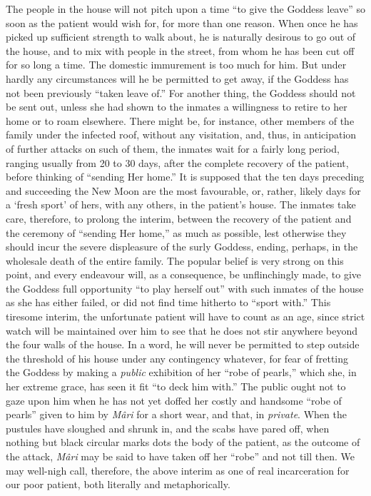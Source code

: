 \documentclass[a4paper, 12pt, oneside, english]{article}
\begin{document}
The people in the house will not pitch upon a time ``to give the Goddess leave'' so soon as the patient would wish for, for more than one reason. When once he has picked up sufficient strength to walk about, he is naturally desirous to go out of the house, and to mix with people in the street, from whom he has been cut off for so long a time. The domestic immurement is too much for him. But under hardly any circumstances will he be permitted to get away, if the Goddess has not been previously ``taken leave of.'' For another thing, the Goddess should not be sent out, unless she had shown to the inmates a willingness to retire to her home or to roam elsewhere. There might be, for instance, other members of the family under the infected roof, without any visitation, and, thus, in anticipation of further attacks on such of them, the inmates wait for a fairly long period, ranging usually from 20 to 30 days, after the complete recovery of the patient, before thinking of ``sending Her home.'' It is supposed that the ten days preceding and succeeding the New Moon are the most favourable, or, rather, likely days for a `fresh sport' of hers, with any others, in the patient's house. The inmates take care, therefore, to prolong the interim, between the recovery of the patient and the ceremony of ``sending Her home,'' as much as possible, lest otherwise they should incur the severe displeasure of the surly Goddess, ending, perhaps, in the wholesale death of the entire family. The popular belief is very strong on this point, and every endeavour will, as a consequence, be unflinchingly made, to give the Goddess full opportunity ``to play herself out'' with such inmates of the house as she has either failed, or did not find time hitherto to ``sport with.'' This tiresome interim, the unfortunate patient will have to count as an age, since strict watch will be maintained over him to see that he does not stir anywhere beyond the four walls of the house. In a word, he will never be permitted to step outside the threshold of his house under any contingency whatever, for fear of fretting the Goddess by making a \emph{public} exhibition of her ``robe of pearls,'' which she, in her extreme grace, has seen it fit ``to deck him with.'' The public ought not to gaze upon him when he has not yet doffed her costly and handsome ``robe of pearls'' given to him by \emph{Mâri} for a short wear, and that, in \emph{private}. When the pustules have sloughed and shrunk in, and the scabs have pared off, when nothing but black circular marks dots the body of the patient, as the outcome of the attack, \emph{Mâri} may be said to have taken off her ``robe'' and not till then. We may well-nigh call, therefore, the above interim as one of real incarceration for our poor patient, both literally and metaphorically.
\end{document}
